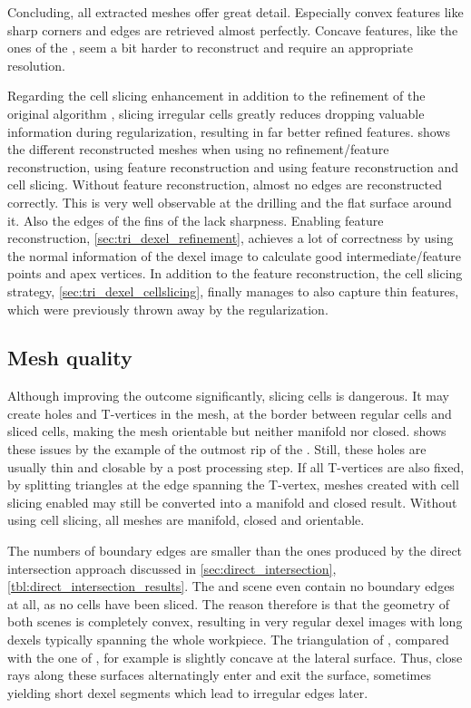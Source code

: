 Concluding, all extracted meshes offer great detail.
Especially convex features like sharp corners and edges are retrieved almost perfectly.
Concave features, like the ones of the \turbine, seem a bit harder to reconstruct and require an appropriate resolution.

Regarding the cell slicing enhancement in addition to the refinement of the original algorithm \cite{tridexel_reconstruction}, slicing irregular cells greatly reduces dropping valuable information during regularization, resulting in far better refined features.
 shows the different reconstructed meshes when using no refinement/feature reconstruction, using feature reconstruction and using feature reconstruction and cell slicing.
Without feature reconstruction, almost no edges are reconstructed correctly.
This is very well observable at the drilling and the flat surface around it.
Also the edges of the fins of the \cylinderhead lack sharpness.
Enabling feature reconstruction, \cf \cref{sec:tri_dexel_refinement}, achieves a lot of correctness by using the normal information of the dexel image to calculate good intermediate/feature points and apex vertices.
In addition to the feature reconstruction, the cell slicing strategy, \cf \cref{sec:tri_dexel_cellslicing}, finally manages to also capture thin features, which were previously thrown away by the regularization.


\subsection{Mesh quality}

Although improving the outcome significantly, slicing cells is dangerous.
It may create holes and T-vertices in the mesh, at the border between regular cells and sliced cells, making the mesh orientable but neither manifold nor closed.
 shows these issues by the example of the outmost rip of the \cylinderhead.
Still, these holes are usually thin and closable by a post processing step.
If all T-vertices are also fixed, \eg by splitting triangles at the edge spanning the T-vertex, meshes created with cell slicing enabled may still be converted into a manifold and closed result.
Without using cell slicing, all meshes are manifold, closed and orientable.

The numbers of boundary edges are smaller than the ones produced by the direct intersection approach discussed in \cref{sec:direct_intersection}, \cf \cref{tbl:direct_intersection_results}.
The \cubes and \cylinders scene even contain no boundary edges at all, as no cells have been sliced.
The reason therefore is that the geometry of both scenes is completely convex, resulting in very regular dexel images with long dexels typically spanning the whole workpiece.
The triangulation of \cylindersd, compared with the one of \cylinders, for example is slightly concave at the lateral surface.
Thus, close rays along these surfaces alternatingly enter and exit the surface, sometimes yielding short dexel segments which lead to irregular edges later.

